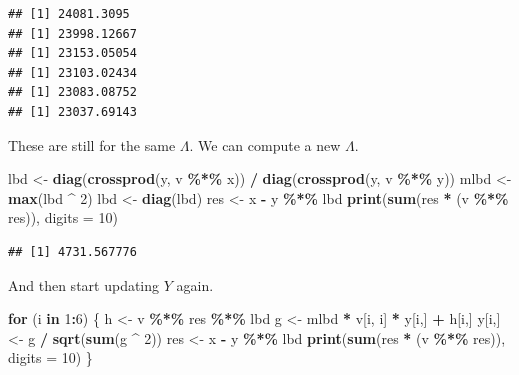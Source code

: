 \documentclass[
  12pt,
]{article}
\newenvironment{Shaded}{\begin{snugshade}}{\end{snugshade}}
\newcommand{\AttributeTok}[1]{\textcolor[rgb]{0.13,0.29,0.53}{#1}}
\newcommand{\ControlFlowTok}[1]{\textcolor[rgb]{0.13,0.29,0.53}{\textbf{#1}}}
\newcommand{\DecValTok}[1]{\textcolor[rgb]{0.00,0.00,0.81}{#1}}
\newcommand{\FunctionTok}[1]{\textcolor[rgb]{0.13,0.29,0.53}{\textbf{#1}}}
\newcommand{\NormalTok}[1]{#1}
\newcommand{\OtherTok}[1]{\textcolor[rgb]{0.56,0.35,0.01}{#1}}
\newcommand{\SpecialCharTok}[1]{\textcolor[rgb]{0.81,0.36,0.00}{\textbf{#1}}}
\begin{document}
\begin{verbatim}
## [1] 24081.3095
## [1] 23998.12667
## [1] 23153.05054
## [1] 23103.02434
## [1] 23083.08752
## [1] 23037.69143
\end{verbatim}

These are still for the same \(\Lambda\). We can compute a new \(\Lambda\).

\begin{Shaded}
\begin{Highlighting}[]
\NormalTok{lbd }\OtherTok{\textless{}{-}} \FunctionTok{diag}\NormalTok{(}\FunctionTok{crossprod}\NormalTok{(y, v }\SpecialCharTok{\%*\%}\NormalTok{ x)) }\SpecialCharTok{/} \FunctionTok{diag}\NormalTok{(}\FunctionTok{crossprod}\NormalTok{(y, v }\SpecialCharTok{\%*\%}\NormalTok{ y))}
\NormalTok{mlbd }\OtherTok{\textless{}{-}} \FunctionTok{max}\NormalTok{(lbd }\SpecialCharTok{\^{}} \DecValTok{2}\NormalTok{)}
\NormalTok{lbd }\OtherTok{\textless{}{-}} \FunctionTok{diag}\NormalTok{(lbd)}
\NormalTok{res }\OtherTok{\textless{}{-}}\NormalTok{ x }\SpecialCharTok{{-}}\NormalTok{ y }\SpecialCharTok{\%*\%}\NormalTok{ lbd}
\FunctionTok{print}\NormalTok{(}\FunctionTok{sum}\NormalTok{(res }\SpecialCharTok{*}\NormalTok{ (v }\SpecialCharTok{\%*\%}\NormalTok{ res)), }\AttributeTok{digits =} \DecValTok{10}\NormalTok{)}
\end{Highlighting}
\end{Shaded}

\begin{verbatim}
## [1] 4731.567776
\end{verbatim}

And then start updating \(Y\) again.

\begin{Shaded}
\begin{Highlighting}[]
\ControlFlowTok{for}\NormalTok{ (i }\ControlFlowTok{in} \DecValTok{1}\SpecialCharTok{:}\DecValTok{6}\NormalTok{) \{}
\NormalTok{  h }\OtherTok{\textless{}{-}}\NormalTok{ v }\SpecialCharTok{\%*\%}\NormalTok{ res }\SpecialCharTok{\%*\%}\NormalTok{ lbd}
\NormalTok{  g }\OtherTok{\textless{}{-}}\NormalTok{ mlbd }\SpecialCharTok{*}\NormalTok{ v[i, i] }\SpecialCharTok{*}\NormalTok{ y[i,] }\SpecialCharTok{+}\NormalTok{ h[i,]}
\NormalTok{  y[i,] }\OtherTok{\textless{}{-}}\NormalTok{ g }\SpecialCharTok{/} \FunctionTok{sqrt}\NormalTok{(}\FunctionTok{sum}\NormalTok{(g }\SpecialCharTok{\^{}} \DecValTok{2}\NormalTok{))}
\NormalTok{  res }\OtherTok{\textless{}{-}}\NormalTok{ x }\SpecialCharTok{{-}}\NormalTok{ y }\SpecialCharTok{\%*\%}\NormalTok{ lbd}
  \FunctionTok{print}\NormalTok{(}\FunctionTok{sum}\NormalTok{(res }\SpecialCharTok{*}\NormalTok{ (v }\SpecialCharTok{\%*\%}\NormalTok{ res)), }\AttributeTok{digits =} \DecValTok{10}\NormalTok{)}
\NormalTok{\}}
\end{Highlighting}
\end{Shaded}
\end{document}
